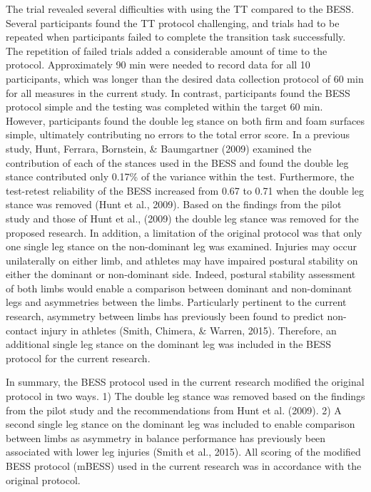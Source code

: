\documentclass[
  english,
  man,floatsintext]{apa6}
\begin{document}
The trial revealed several difficulties with using the TT compared to the BESS.
Several participants found the TT protocol challenging, and trials had to be repeated when participants failed to complete the transition task successfully.
The repetition of failed trials added a considerable amount of time to the protocol.
Approximately 90 min were needed to record data for all 10 participants, which was longer than the desired data collection protocol of 60 min for all measures in the current study.
In contrast, participants found the BESS protocol simple and the testing was completed within the target 60 min.
However, participants found the double leg stance on both firm and foam surfaces simple, ultimately contributing no errors to the total error score.
In a previous study, Hunt, Ferrara, Bornstein, \& Baumgartner (2009) examined the contribution of each of the stances used in the BESS and found the double leg stance contributed only 0.17\% of the variance within the test.
Furthermore, the test-retest reliability of the BESS increased from 0.67 to 0.71 when the double leg stance was removed (Hunt et al., 2009).
Based on the findings from the pilot study and those of Hunt et al., (2009) the double leg stance was removed for the proposed research.
In addition, a limitation of the original protocol was that only one single leg stance on the non-dominant leg was examined.
Injuries may occur unilaterally on either limb, and athletes may have impaired postural stability on either the dominant or non-dominant side.
Indeed, postural stability assessment of both limbs would enable a comparison between dominant and non-dominant legs and asymmetries between the limbs.
Particularly pertinent to the current research, asymmetry between limbs has previously been found to predict non-contact injury in athletes (Smith, Chimera, \& Warren, 2015).
Therefore, an additional single leg stance on the dominant leg was included in the BESS protocol for the current research.

In summary, the BESS protocol used in the current research modified the original protocol in two ways. 1) The double leg stance was removed based on the findings from the pilot study and the recommendations from Hunt et al. (2009). 2) A second single leg stance on the dominant leg was included to enable comparison between limbs as asymmetry in balance performance has previously been associated with lower leg injuries (Smith et al., 2015).
All scoring of the modified BESS protocol (mBESS) used in the current research was in accordance with the original protocol.
\end{document}
